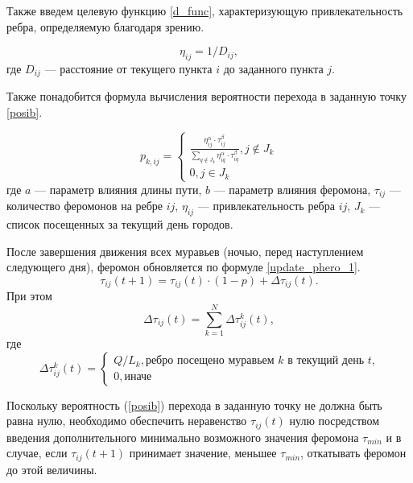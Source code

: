 Также введем целевую функцию \eqref{d_func}, характеризующую привлекательность ребра, определяемую благодаря зрению.

\begin{equation}
	\label{d_func}
	\eta_{ij} = 1 / D_{ij},
\end{equation}
где $D_{ij}$ — расстояние от текущего пункта $i$ до заданного пункта $j$.


Также понадобится формула вычисления вероятности перехода в заданную точку \eqref{posib}.

\begin{equation}
	\label{posib}
	p_{k,ij} = \begin{cases}
		\frac{\eta_{ij}^{\alpha}\cdot\tau_{ij}^{\beta}}{\sum_{q\notin J_k} \eta^\alpha_{iq}\cdot\tau^\beta_{iq}}, j \notin J_k \\
		0, j \in J_k
	\end{cases}
\end{equation}
где $a$ --- параметр влияния длины пути, $b$ --- параметр влияния феромона, $\tau_{ij}$ --- количество феромонов на ребре $ij$, $\eta_{ij}$ --- привлекательность ребра $ij$, $J_k$ --- список посещенных за текущий день городов.

После завершения движения всех муравьев (ночью, перед наступлением следующего дня), феромон обновляется по формуле \eqref{update_phero_1}.
\begin{equation}
	\label{update_phero_1}
	\tau_{ij}(t+1) = \tau_{ij}(t)\cdot(1-p) + \Delta \tau_{ij}(t).
\end{equation}
При этом
\begin{equation}
	\label{update_phero_2}
	\Delta \tau_{ij}(t) = \sum_{k=1}^N \Delta \tau^k_{ij}(t),
\end{equation}
где
\begin{equation}
	\label{update_phero_3}
	\Delta\tau^k_{ij}(t) = \begin{cases}
		Q/L_{k}, \textrm{ребро посещено муравьем $k$ в текущий день $t$,} \\
		0, \textrm{иначе}
	\end{cases}
\end{equation}

Поскольку вероятность (\ref{posib}) перехода в заданную точку не должна быть равна нулю, необходимо обеспечить неравенство $\tau_{ij} (t)$ нулю посредством введения дополнительного минимально возможного значения феромона $\tau_{min}$ и в случае, если $\tau_{ij} (t+1)$ принимает значение, меньшее $\tau_{min}$, откатывать феромон до этой величины. 


